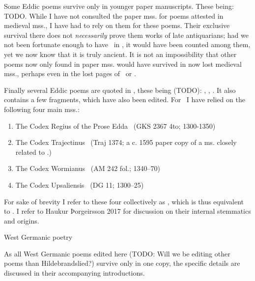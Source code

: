     Some Eddic poems survive only in younger paper manuscripts. These being: TODO. While I have not consulted the paper mss. for poems attested in medieval mss., I have had to rely on them for these poems. Their exclusive survival there does not \emph{necessarily} prove them works of late antiquarians; had we not been fortunate enough to have \Baldrsdraumar\ in \AM, it would have been counted among them, yet we now know that it is truly ancient. It is not an impossibility that other poems now only found in paper mss. would have survived in now lost medieval mss., perhaps even in the lost pages of \Regius\ or \AM.

    Finally several Eddic poems are quoted in \Gylfaginning, these being (TODO): \Voluspa, \Vafthrudnismal, \Grimnismal. It also contains a few fragments, which have also been edited. For \Gylfaginning\ I have relied on the following four main mss.:\begin{enumerate}
	   \item The Codex Regius of the Prose Edda \RegiusProse\ (GKS 2367 4to; 1300-1350)
     \item The Codex Trajectinus \Trajectinus\ (Traj 1374; a c. 1595 paper copy of a ms. closely related to \RegiusProse.)
     \item The Codex Wormianus \Wormianus\ (AM 242 fol.; 1340–70)
     \item The Codex Upsaliensis \Upsaliensis\ (DG 11; 1300–25)\end{enumerate}

     For sake of brevity I refer to these four collectively as \GylfMS, which is thus equivalent to \RegiusProse\Trajectinus\Wormianus\Upsaliensis. I refer to Haukur Þorgeirsson 2017 for discussion on their internal stemmatics and origins.

     West Germanic poetry

     As all West Germanic poems edited here (TODO: Will we be editing other poems than Hildebrandslied?) survive only in one copy, the specific details are discussed in their accompanying introductions.

\printbibliography%

